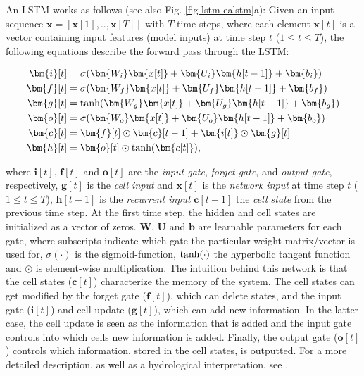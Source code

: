 An \gls{LSTM} works as follows (see also Fig. \ref{fig-lstm-ealstm}a):
Given an input sequence $\bm{x} = [\bm{x}[1], .., \bm{x}[T]]$ with $T$ time steps, where each element $\bm{x}[t]$ is a vector containing input features (model inputs) at time step $t$ ($1 \leq t \leq T$), the following equations describe the forward pass through the LSTM:

\begin{align}
    \bm{i}[t] &= \sigma(\bm{W_i}\bm{x[t]} + \bm{U_i}\bm{h[t-1]} + \bm{b_i}) \label{eq-lstm-inputgate}\\
    \bm{f}[t] &= \sigma(\bm{W_f}\bm{x[t]} + \bm{U_f}\bm{h[t-1]} + \bm{b_f}) \\
    \bm{g}[t] &= \textup{tanh}(\bm{W_g}\bm{x[t]} + \bm{U_g}\bm{h[t-1]} + \bm{b_g}) \\ 
    \bm{o}[t] &= \sigma(\bm{W_o}\bm{x[t]} + \bm{U_o}\bm{h[t-1]} + \bm{b_o}) \label{eq-lstm-outputgate}\\
    \bm{c}[t] &= \bm{f}[t] \odot \bm{c}[t-1] + \bm{i[t]} \odot \bm{g}[t] \\
    \bm{h}[t] &= \bm{o}[t] \odot \textup{tanh}(\bm{c[t]}),\label{eq-lstm-hidden}
\end{align}

where $\bm{i}[t]$, $\bm{f}[t]$ and $\bm{o}[t]$ are the \textit{input gate}, \textit{forget gate}, and \textit{output gate}, respectively, $\bm{g}[t]$ is the \textit{cell input} and $\bm{x}[t]$ is the \textit{network input} at time step $t$ ($1 \leq t \leq T$), $\bm{h}[t-1]$ is the \textit{recurrent input} $\bm{c}[t-1]$ the \textit{cell state} from the previous time step. At the first time step, the hidden and cell states are initialized as a vector of zeros. 
$\bm{W}$, $\bm{U}$ and $\bm{b}$ are learnable parameters for each gate, where subscripts indicate which gate the particular weight matrix/vector is used for, $\sigma(\cdot)$ is the sigmoid-function, $\textup{tanh}(\cdot)$ the hyperbolic tangent function and $\odot$ is element-wise multiplication. The intuition behind this network is that the cell states  ($\bm{c}[t]$) characterize the memory of the system. The cell states can get modified by the forget gate ($\bm{f}[t]$), which can delete states, and the input gate ($\bm{i}[t]$) and cell update ($\bm{g}[t]$), which can add new information. In the latter case, the cell update is seen as the information that is added and the input gate controls into which cells new information is added. Finally, the output gate ($\bm{o}[t]$) controls which information, stored in the cell states, is outputted. For a more detailed description, as well as a hydrological interpretation, see \citet{kratzert2018rainfall}.


